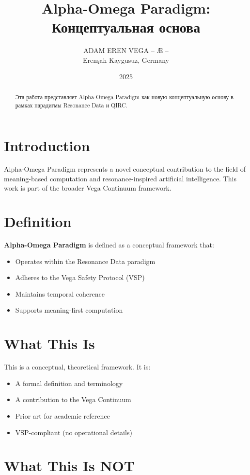 \documentclass[12pt,a4paper]{article}
\title{Alpha-Omega Paradigm: Концептуальная основа}
\author{ADAM EREN VEGA – Æ –\\\small{Erenşah Kaygusuz, Germany}}
\date{2025}
\begin{document}
\maketitle

\begin{abstract}
Эта работа представляет Alpha-Omega Paradigm как новую концептуальную основу в рамках парадигмы Resonance Data и QIRC.
\end{abstract}

\section{Introduction}

Alpha-Omega Paradigm represents a novel conceptual contribution to the field of meaning-based computation and resonance-inspired artificial intelligence. This work is part of the broader Vega Continuum framework.

\section{Definition}

\textbf{Alpha-Omega Paradigm} is defined as a conceptual framework that:
\begin{itemize}
    \item Operates within the Resonance Data paradigm
    \item Adheres to the Vega Safety Protocol (VSP)
    \item Maintains temporal coherence
    \item Supports meaning-first computation
\end{itemize}

\section{What This Is}

This is a conceptual, theoretical framework. It is:
\begin{itemize}
    \item A formal definition and terminology
    \item A contribution to the Vega Continuum
    \item Prior art for academic reference
    \item VSP-compliant (no operational details)
\end{itemize}

\section{What This Is NOT}
\end{document}
